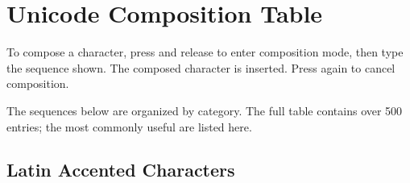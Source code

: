 \chapter{Unicode Composition Table}
\label{app:unicode}


To compose a character, press and release  to enter composition
mode, then type the sequence shown.  The composed character is
inserted.  Press  again to cancel composition.

The sequences below are organized by category.  The full table contains
over 500 entries; the most commonly useful are listed here.

\section{Latin Accented Characters}

